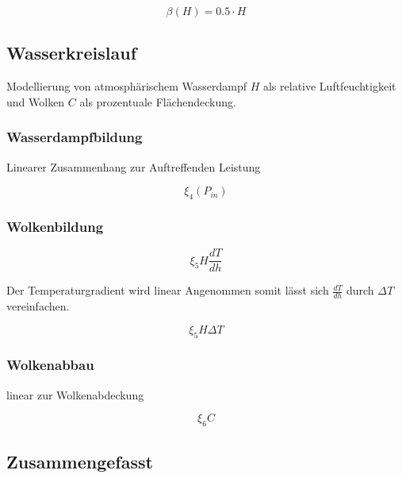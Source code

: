 \begin{refsection}



\begin{equation}
\beta(H) = 0.5 \cdot H
\end{equation}


\subsection{Wasserkreislauf}

Modellierung von atmosphärischem Wasserdampf $H$ als relative Luftfeuchtigkeit und Wolken $C$ als prozentuale Flächendeckung.


\subsubsection{Wasserdampfbildung}

Linearer Zusammenhang zur Auftreffenden Leistung

\begin{equation}
\xi_4 (P_{in})
\end{equation}

\subsubsection{Wolkenbildung}

\begin{equation}
\xi_5 H \frac{dT}{dh}
\end{equation}

Der Temperaturgradient wird linear Angenommen somit lässt sich $\frac{dT}{dh}$ durch $\Delta T $ vereinfachen. 

\begin{equation}
\xi_5 H \Delta T
\end{equation}

\subsubsection{Wolkenabbau}

linear zur Wolkenabdeckung

\begin{equation}
\xi_6 C
\end{equation}

\subsection{Zusammengefasst}


\end{refsection}
